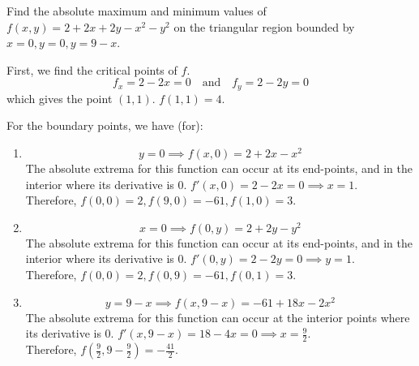 \begin{example}
    \normalfont Find the absolute maximum and minimum values of $f(x, y) = 2 + 2x + 2y - x^2 - y^2$ on the triangular
    region bounded by $x = 0, y = 0, y = 9 - x$.

    First, we find the critical points of $f$.
    $$f_x = 2 - 2x = 0 \ \ \ \text{ and } \ \ \ f_y = 2 - 2y = 0$$
    which gives the point $(1, 1)$. $f(1, 1) = 4$.

    For the boundary points, we have (for):
    \begin{enumerate}
        \item
        $$y = 0 \implies f(x, 0) = 2 + 2x - x^2$$
        The absolute extrema for this function can occur at its end-points, and in the interior where its derivative is 0.
        $f'(x, 0) = 2 - 2x = 0 \implies x = 1$. \\
        Therefore, $f(0, 0) = 2, f(9, 0) = -61, f(1, 0) = 3$.

        \item
        $$x = 0 \implies f(0, y) = 2 + 2y - y^2$$
        The absolute extrema for this function can occur at its end-points, and in the interior where its derivative is 0.
        $f'(0, y) = 2 - 2y = 0 \implies y = 1$. \\
        Therefore, $f(0, 0) = 2, f(0, 9) = -61, f(0, 1) = 3$.

        \item
        $$y = 9 - x \implies f(x, 9-x) = -61 + 18x - 2x^2$$
        The absolute extrema for this function can occur at the interior points where its derivative is 0.
        $f'(x, 9-x) = 18 - 4x = 0 \implies x = \frac{9}{2}$. \\
        Therefore, $f(\frac{9}{2}, 9-\frac{9}{2}) = -\frac{41}{2}$.
    \end{enumerate}
\end{example}